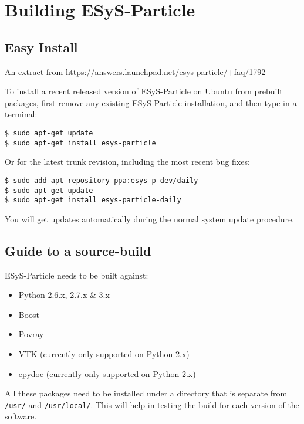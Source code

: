 
\chapter{Building ESyS-Particle}
\label{cha:building_esys_particle}

\section{Easy Install}
\label{sec:easy_install}

An extract from \url{https://answers.launchpad.net/esys-particle/+faq/1792}

To install a recent released version of ESyS-Particle on Ubuntu from prebuilt packages, first remove any existing ESyS-Particle installation, and then type in a terminal:
\begin{lstlisting}[style=inlineBash]
$ sudo apt-get update
$ sudo apt-get install esys-particle
\end{lstlisting}

Or for the latest trunk revision, including the most recent bug fixes:
\begin{lstlisting}[style=inlineBash]
$ sudo add-apt-repository ppa:esys-p-dev/daily
$ sudo apt-get update
$ sudo apt-get install esys-particle-daily
\end{lstlisting}

You will get updates automatically during the normal system update procedure.

\section{Guide to a source-build}
\label{sec:guide_to_a_source_build}

ESyS-Particle needs to be built against:
\begin{itemize}[noitemsep,nolistsep]
	\item Python 2.6.x, 2.7.x \& 3.x
	\item Boost
	\item Povray
	\item VTK (currently only supported on Python 2.x)
	\item epydoc (currently only supported on Python 2.x)
\end{itemize}

All these packages need to be installed under a directory that is separate from \lstinline{/usr/} and \lstinline{/usr/local/}. This will help in testing the build for each version of the software.

